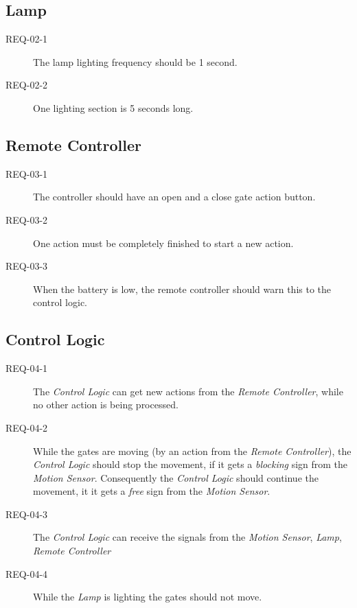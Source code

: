 \subsection{Lamp}
\begin{description}
	\item [REQ-02-1] The lamp lighting frequency should be 1 second.
	\item [REQ-02-2] One lighting section is 5 seconds long.
\end{description}

\subsection{Remote Controller}
\begin{description}
	\item [REQ-03-1] The controller should have an open and a close gate action button.
	\item [REQ-03-2] One action must be completely finished to start a new action. 
	\item [REQ-03-3] When the battery is low, the remote controller should warn this to the control logic. %
\end{description}

\subsection{Control Logic}
\begin{description}
	\item [REQ-04-1] The \textit{Control Logic} can get new actions from the \textit{Remote Controller}, while no other action is being processed.
	\item [REQ-04-2] While the gates are moving (by an action from the \textit{Remote Controller}), the \textit{Control Logic} should stop the movement, if it gets a \textit{blocking} sign from the \textit{Motion Sensor}. Consequently the \textit{Control Logic} should continue the movement, it it gets a \textit{free} sign from the \textit{Motion Sensor}.
	\item [REQ-04-3] The \textit{Control Logic} can receive the signals from the \textit{Motion Sensor}, \textit{Lamp}, \textit{Remote Controller}
	\item [REQ-04-4] While the \textit{Lamp} is lighting the gates should not move.
\end{description}

